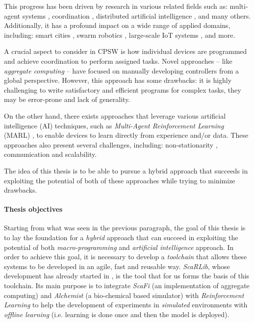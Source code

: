 \documentclass[12pt,a4paper,openright,twoside]{book}
\begin{document}
This progress has been driven by research in various related fields such as: multi-agent systems \cite{dorri2018multi},
    coordination \cite{yang2022overview}, distributed artificial intelligence \cite{bond2014readings}, and many others. 
    Additionally, it has a profound impact on a wide range of applied domains, including: smart cities \cite{zedadra2019swarm}, 
    swarm robotics \cite{brambilla2013swarm}, large-scale IoT systems \cite{uslu2023role}, and more.

A crucial aspect to consider in CPSW is how individual devices are programmed and achieve coordination to perform assigned tasks. 
Novel approaches -- like \emph{aggregate computing} \cite{viroli2018field} -- have focused on manually developing
controllers from a global perspective. However, this approach has some drawbacks: it is highly challenging to write satisfactory 
and efficient programs for complex tasks, they may be error-prone and lack of generality.

On the other hand, there exists approaches that leverage various artificial intelligence (AI) techniques, 
such as \emph{Multi-Agent Reinforcement Learning} (MARL) \cite{busoniu2008comprehensive, marlsurvey},
to enable devices to learn directly from experience and/or data. These approaches also present several challenges, including: non-stationarity 
\cite{hernandez2017survey}, communication and scalability.

The idea of this thesis is to be able to pursue a hybrid approach that succeeds in exploiting the potential of both 
    of these approaches while trying to minimize drawbacks.
%
\paragraph{Thesis objectives}

Starting from what was seen in the previous paragraph, the goal of this thesis is to lay the foundation for a \emph{hybrid} approach 
    that can succeed in exploiting the potential of both \emph{macro-programming} and \emph{artificial intelligence} approach.
    In order to achieve this goal, it is necessary to develop a \emph{toolchain} that allows these systems to be developed in an agile,
    fast and reusable way. 
    \emph{ScaRLib}, whose development has already started in \cite{scarlib}, is the tool that for us forms the basis of this toolchain.
    Its main purpose is to integrate \emph{ScaFi} \cite{casadei2022scafi} (an implementation of aggregate computing) 
    and \emph{Alchemist} \cite{pianini2013chemical} (a bio-chemical based simulator) with \emph{Reinforcement Learning} 
    to help the development of experiments in \emph{simulated} environments with \emph{offline learning}
    (i.e. learning is done once and then the model is deployed).
\end{document}
